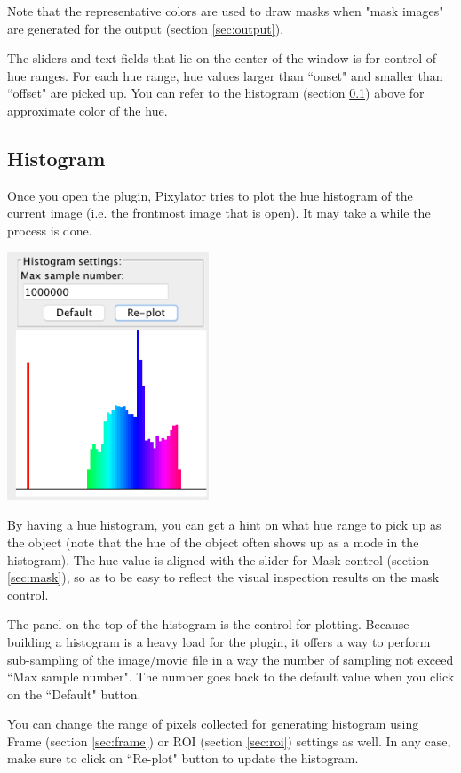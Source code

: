 \documentclass[a4paper,oneside,10pt]{article}
\newcommand{\secref}[1]{(section \ref{sec:#1})}
\begin{document}
Note that the representative colors are used to draw masks when "mask images" are generated for the output \secref{output}.

The sliders and text fields that lie on the center of the window is for control of hue ranges. For each hue range, hue values larger than ``onset" and smaller than ``offset" are picked up. You can refer to the histogram \secref{histo} above for approximate color of the hue.



\subsection{Histogram}
\label{sec:histo}
Once you open the plugin, Pixylator tries to plot the hue histogram of the current image (i.e. the frontmost image that is open). It may take a while the process is done.

\includegraphics[width=6cm]{histogram.png}

By having a hue histogram, you can get a hint on what hue range to pick up as the object (note that the hue of the object often shows up as a mode in the histogram). The hue value is aligned with the slider for Mask  control \secref{mask}, so as to be easy to reflect the visual inspection results on the mask control.

The panel on the top of the histogram is the control for plotting. Because building a histogram is a heavy load for the plugin, it offers a way to perform sub-sampling of the image/movie file in a way the number of sampling not exceed ``Max sample number". The number goes back to the default value when you click on the ``Default" button.

You can change the range of pixels collected for generating histogram using Frame \secref{frame} or ROI \secref{roi} settings as well. In any case, make sure to click on ``Re-plot" button to update the histogram.
\end{document}
